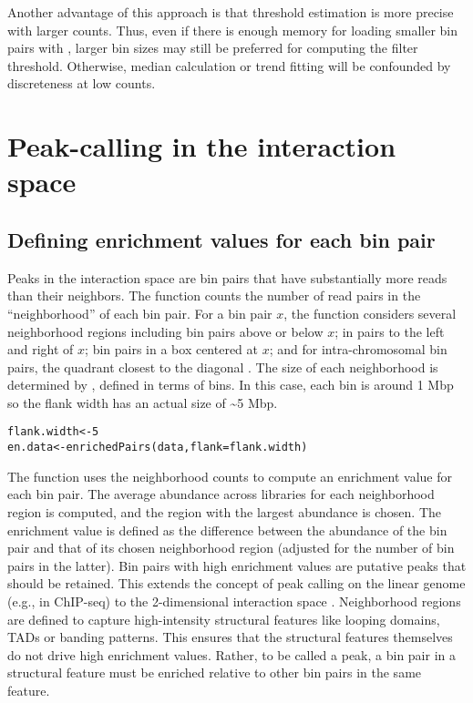 \documentclass{report}\usepackage[]{graphicx}\usepackage[usenames,dvipsnames]{color}
\newcommand{\hlnum}[1]{\textcolor[rgb]{0.816,0.125,0.439}{#1}}%
\newcommand{\hlstd}[1]{\textcolor[rgb]{0.251,0.251,0.251}{#1}}%
\newcommand{\hlkwb}[1]{\textcolor[rgb]{0,0,0}{#1}}%
\newcommand{\hlkwc}[1]{\textcolor[rgb]{0.251,0.251,0.251}{#1}}%
\newcommand{\hlkwd}[1]{\textcolor[rgb]{0.878,0.439,0.125}{#1}}%
\newenvironment{knitrout}{}{} %
\begin{document}
Another advantage of this approach is that threshold estimation is more precise with larger counts.
Thus, even if there is enough memory for loading smaller bin pairs with , larger bin sizes may still be preferred for computing the filter threshold.
Otherwise, median calculation or trend fitting will be confounded by discreteness at low counts.

\section{Peak-calling in the interaction space}

\subsection{Defining enrichment values for each bin pair}
Peaks in the interaction space are bin pairs that have substantially more reads than their neighbors.
The  function counts the number of read pairs in the ``neighborhood'' of each bin pair.
For a bin pair $x$, the function considers several neighborhood regions including bin pairs above or below $x$; in pairs to the left and right of $x$; bin pairs in a box centered at $x$; and for intra-chromosomal bin pairs, the quadrant closest to the diagonal \cite{rao2014kilobase}.
The size of each neighborhood is determined by , defined in terms of bins.
In this case, each bin is around 1 Mbp so the flank width has an actual size of \textasciitilde{}5 Mbp.

\begin{knitrout}
\color{fgcolor}\begin{kframe}
\begin{alltt}
\hlstd{flank.width} \hlkwb{<-} \hlnum{5}
\hlstd{en.data} \hlkwb{<-} \hlkwd{enrichedPairs}\hlstd{(data,} \hlkwc{flank}\hlstd{=flank.width)}
\end{alltt}
\end{kframe}
\end{knitrout}

The  function uses the neighborhood counts to compute an enrichment value for each bin pair.
The average abundance across libraries for each neighborhood region is computed, and the region with the largest abundance is chosen.
The enrichment value is defined as the difference between the abundance of the bin pair and that of its chosen neighborhood region (adjusted for the number of bin pairs in the latter).
Bin pairs with high enrichment values are putative peaks that should be retained.
This extends the concept of peak calling on the linear genome (e.g., in ChIP-seq) to the 2-dimensional interaction space \cite{rao2014kilobase}.
Neighborhood regions are defined to capture high-intensity structural features like looping domains, TADs or banding patterns.
This ensures that the structural features themselves do not drive high enrichment values.
Rather, to be called a peak, a bin pair in a structural feature must be enriched relative to other bin pairs in the same feature.
\end{document}
